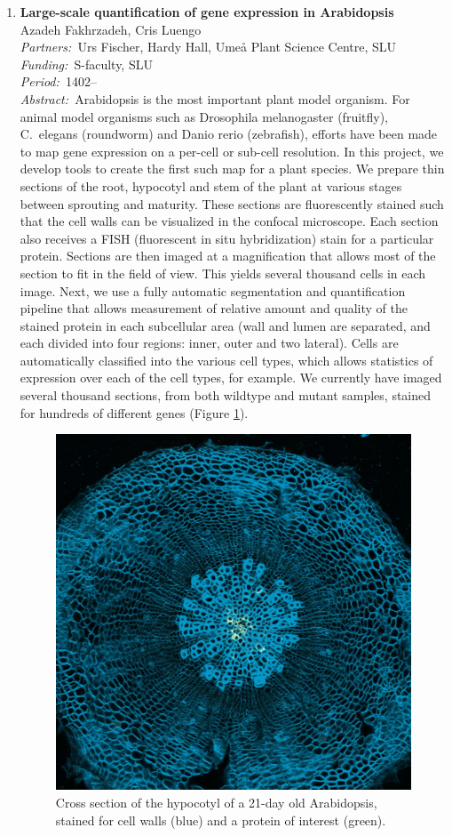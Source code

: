 \documentclass[10pt, a4paper]{article}
\newcommand{\aabstract}[1]{\emph{Abstract:~}#1}
\newcommand{\ffunding}[1]{\emph{Funding:~}#1\\}
\newcommand{\ppartners}[1]{\emph{Partners:~}#1\\}
\newcommand{\pperiod}[1]{\emph{Period:~}#1\\}
\begin{document}
{\begin{enumerate}
\item
	\textbf{Large-scale quantification of gene expression in Arabidopsis}\\
	Azadeh Fakhrzadeh, Cris Luengo \\
	\ppartners{Urs Fischer, Hardy Hall, Ume\r{a} Plant Science Centre, SLU}
	\ffunding{S-faculty, SLU}
	\pperiod{1402--}
	\aabstract{Arabidopsis is the most important plant model organism. For animal model organisms such as Drosophila melanogaster (fruitfly), C.\ elegans 
(roundworm) and Danio rerio (zebrafish), efforts have been made to map gene 
expression on a per-cell or sub-cell resolution. In this project, we develop tools to create the first such map for a plant species. We prepare thin sections of the root, hypocotyl and stem of the plant at various stages between sprouting and maturity. These sections are fluorescently stained such that the cell 
walls can be visualized in the confocal microscope. Each section also receives a FISH (fluorescent in situ hybridization) stain for a particular protein. 
Sections are then imaged at a magnification that allows most of the section to fit in the field of view. This yields several thousand cells in each image. Next, we use a fully automatic segmentation and quantification pipeline that allows measurement of relative amount and quality of the stained protein in each 
subcellular area (wall and lumen are separated, and each divided into four regions: inner, outer and two lateral). Cells are automatically classified into the various cell types, which allows statistics of expression over each of the cell types, for example. We currently have imaged several thousand sections, from both wildtype and mutant samples, stained for hundreds of different genes (Figure \ref {fig:arabidopsis}).}

	\begin{figure}[!h]
		\centering
		
		\includegraphics[width=0.48\linewidth]{figures/research/Arabidopsis.jpg}
		\caption{Cross section of the hypocotyl of a 21-day old Arabidopsis, 
stained for cell walls (blue) and a protein of interest (green).}
		\label{fig:arabidopsis}
	\end{figure}


\end{enumerate}}
\end{document}
